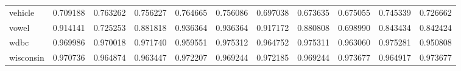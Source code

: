 \begin{tabular}{lrrrrrrrrrr}
vehicle         &   0.709188 &  0.763262 &  0.756227 &  0.764665 &  0.756086 &  0.697038 &  0.673635 &  0.675055 &  0.745339 &  0.726662 \\
vowel           &   0.914141 &  0.725253 &  0.881818 &  0.936364 &  0.936364 &  0.917172 &  0.880808 &  0.698990 &  0.843434 &  0.842424 \\
wdbc            &   0.969986 &  0.970018 &  0.971740 &  0.959551 &  0.975312 &  0.964752 &  0.975311 &  0.963060 &  0.975281 &  0.950808 \\
wisconsin       &   0.970736 &  0.964874 &  0.963447 &  0.972207 &  0.969244 &  0.972185 &  0.969244 &  0.973677 &  0.964917 &  0.973677 \\
\bottomrule
\end{tabular}
